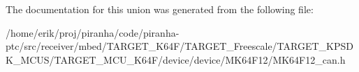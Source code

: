 The documentation for this union was generated from the following file\+:\begin{DoxyCompactItemize}
\item 
/home/erik/proj/piranha/code/piranha-\/ptc/src/receiver/mbed/\+T\+A\+R\+G\+E\+T\+\_\+\+K64\+F/\+T\+A\+R\+G\+E\+T\+\_\+\+Freescale/\+T\+A\+R\+G\+E\+T\+\_\+\+K\+P\+S\+D\+K\+\_\+\+M\+C\+U\+S/\+T\+A\+R\+G\+E\+T\+\_\+\+M\+C\+U\+\_\+\+K64\+F/device/device/\+M\+K64\+F12/M\+K64\+F12\+\_\+can.\+h\end{DoxyCompactItemize}
